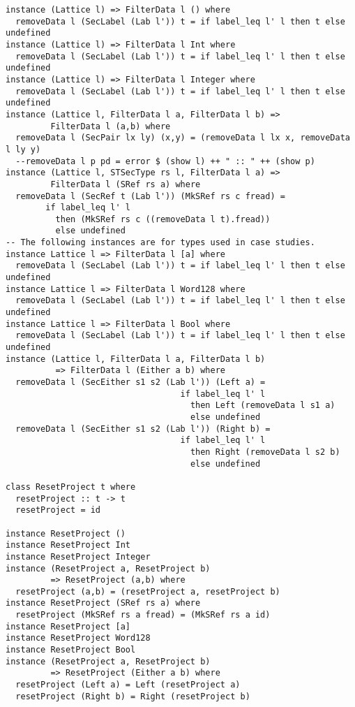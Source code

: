\begin{Verbatim}[fontsize=\footnotesize,frame=lines,
                 framesep=5mm, label={[SecureFlow.hs]SecureFlow.hs}]
instance (Lattice l) => FilterData l () where
  removeData l (SecLabel (Lab l')) t = if label_leq l' l then t else undefined
instance (Lattice l) => FilterData l Int where
  removeData l (SecLabel (Lab l')) t = if label_leq l' l then t else undefined
instance (Lattice l) => FilterData l Integer where
  removeData l (SecLabel (Lab l')) t = if label_leq l' l then t else undefined
instance (Lattice l, FilterData l a, FilterData l b) =>
         FilterData l (a,b) where
  removeData l (SecPair lx ly) (x,y) = (removeData l lx x, removeData l ly y)
  --removeData l p pd = error $ (show l) ++ " :: " ++ (show p)  
instance (Lattice l, STSecType rs l, FilterData l a) => 
         FilterData l (SRef rs a) where
  removeData l (SecRef t (Lab l')) (MkSRef rs c fread) = 
        if label_leq l' l 
          then (MkSRef rs c ((removeData l t).fread))
          else undefined
-- The following instances are for types used in case studies.
instance Lattice l => FilterData l [a] where
  removeData l (SecLabel (Lab l')) t = if label_leq l' l then t else undefined
instance Lattice l => FilterData l Word128 where
  removeData l (SecLabel (Lab l')) t = if label_leq l' l then t else undefined
instance Lattice l => FilterData l Bool where
  removeData l (SecLabel (Lab l')) t = if label_leq l' l then t else undefined
instance (Lattice l, FilterData l a, FilterData l b)
          => FilterData l (Either a b) where
  removeData l (SecEither s1 s2 (Lab l')) (Left a) = 
                                   if label_leq l' l 
                                     then Left (removeData l s1 a)
                                     else undefined
  removeData l (SecEither s1 s2 (Lab l')) (Right b) = 
                                   if label_leq l' l
                                     then Right (removeData l s2 b)
                                     else undefined
  
class ResetProject t where
  resetProject :: t -> t
  resetProject = id

instance ResetProject () 
instance ResetProject Int
instance ResetProject Integer
instance (ResetProject a, ResetProject b) 
         => ResetProject (a,b) where
  resetProject (a,b) = (resetProject a, resetProject b)
instance ResetProject (SRef rs a) where
  resetProject (MkSRef rs a fread) = (MkSRef rs a id)
instance ResetProject [a]
instance ResetProject Word128
instance ResetProject Bool
instance (ResetProject a, ResetProject b) 
         => ResetProject (Either a b) where
  resetProject (Left a) = Left (resetProject a)
  resetProject (Right b) = Right (resetProject b)

\end{Verbatim}
